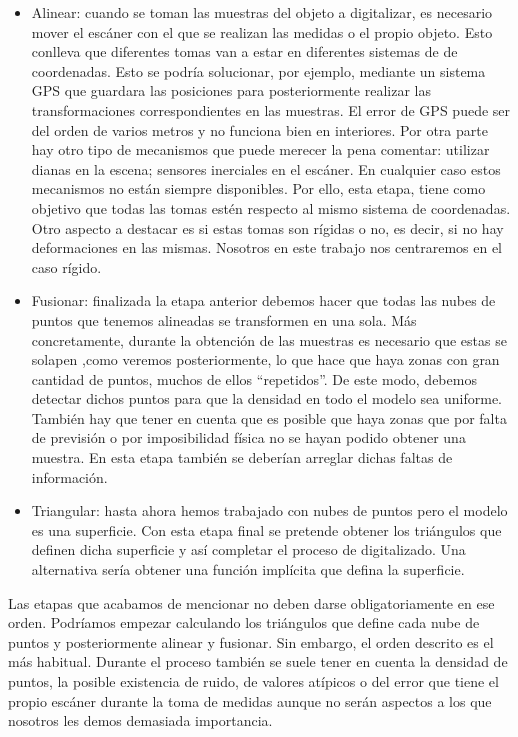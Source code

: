 \begin{itemize}
	\item Alinear: cuando se toman las muestras del objeto a digitalizar, es necesario mover el escáner con el que se realizan las medidas o el propio objeto. Esto conlleva que diferentes tomas van a estar en diferentes sistemas de de coordenadas. Esto se podría solucionar, por ejemplo, mediante un sistema GPS que guardara las posiciones para posteriormente realizar las transformaciones correspondientes en las muestras. El error de GPS puede ser del orden de varios metros y no funciona bien en interiores. Por otra parte hay otro tipo de mecanismos que puede merecer la pena comentar: utilizar dianas en la escena; sensores inerciales en el escáner. En cualquier caso estos mecanismos no están siempre disponibles. Por ello, esta etapa, tiene como objetivo que todas las tomas estén respecto al mismo sistema de coordenadas. Otro aspecto a destacar es si 
	estas tomas son rígidas o no, es decir, si no hay deformaciones en las mismas. Nosotros en este trabajo nos centraremos en el caso rígido. 
	
	\item Fusionar: finalizada la etapa anterior debemos hacer que todas las nubes de puntos que tenemos alineadas se transformen en una sola. Más concretamente, durante la obtención de las muestras es necesario que estas se solapen ,como veremos posteriormente, lo que hace que haya zonas con gran cantidad de puntos, muchos de ellos ``repetidos''. De este modo, debemos detectar dichos puntos para que la densidad en todo el modelo sea uniforme. También hay que tener en cuenta que es posible que haya zonas que por falta de previsión o por imposibilidad física no se hayan podido obtener una muestra. En esta etapa también se deberían arreglar dichas faltas de información. 
	\item Triangular: hasta ahora hemos trabajado con nubes de puntos pero el modelo es una superficie. Con esta etapa final se pretende obtener los triángulos que definen dicha superficie y así completar el proceso de digitalizado. Una alternativa sería obtener una función implícita que defina la superficie.
\end{itemize}

Las etapas que acabamos de mencionar no deben darse obligatoriamente en ese orden. Podríamos empezar calculando los triángulos que define cada nube de puntos y posteriormente alinear y fusionar. Sin embargo, el orden descrito es el más habitual. Durante el proceso también se suele tener en cuenta la densidad de puntos, la posible existencia de ruido, de valores atípicos o del error que tiene el propio escáner durante la toma de medidas aunque no serán aspectos a los que nosotros les demos demasiada importancia.  \\

